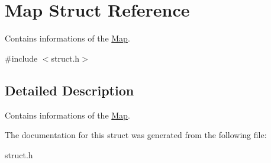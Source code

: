 \hypertarget{struct_map}{}\section{Map Struct Reference}
\label{struct_map}


Contains informations of the \hyperlink{struct_map}{Map}.  




{\ttfamily \#include $<$struct.\+h$>$}



\subsection{Detailed Description}
Contains informations of the \hyperlink{struct_map}{Map}. 

The documentation for this struct was generated from the following file\+:\begin{DoxyCompactItemize}
\item 
struct.\+h\end{DoxyCompactItemize}
